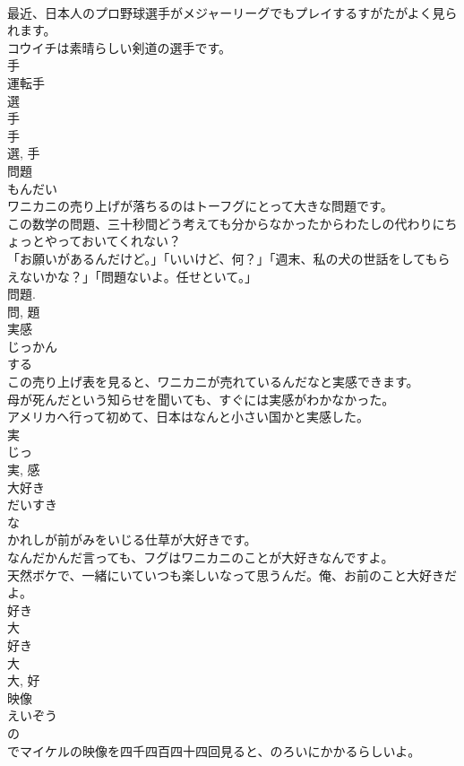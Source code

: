 \documentclass[8pt]{extreport}
\begin{document}
\begin{CJK}{UTF8}{min}
\\	最近、日本人のプロ野球選手がメジャーリーグでもプレイするすがたがよく見られます。	
\\	コウイチは素晴らしい剣道の選手です。	
\\	手 
\\	運転手 
\\	選 
\\	手 
\\	手 
\\	選, 手	
\\	問題	
\\	もんだい	
\\	ワニカニの売り上げが落ちるのはトーフグにとって大きな問題です。	
\\	この数学の問題、三十秒間どう考えても分からなかったからわたしの代わりにちょっとやっておいてくれない？	
\\	「お願いがあるんだけど。」「いいけど、何？」「週末、私の犬の世話をしてもらえないかな？」「問題ないよ。任せといて。」	
\\	問題.	
\\	問, 題	
\\	実感	
\\	じっかん	
\\	する 
\\	この売り上げ表を見ると、ワニカニが売れているんだなと実感できます。	
\\	母が死んだという知らせを聞いても、すぐには実感がわかなかった。	
\\	アメリカへ行って初めて、日本はなんと小さい国かと実感した。	
\\	実 
\\	じっ 
\\	実, 感	
\\	大好き	
\\	だいすき	
\\	な 
\\	かれしが前がみをいじる仕草が大好きです。	
\\	なんだかんだ言っても、フグはワニカニのことが大好きなんですよ。	
\\	天然ボケで、一緒にいていつも楽しいなって思うんだ。俺、お前のこと大好きだよ。	
\\	好き 
\\	大 
\\	好き 
\\	大 
\\	大, 好	
\\	映像	
\\	えいぞう	
\\	の 
\\	でマイケルの映像を四千四百四十四回見ると、のろいにかかるらしいよ。	

\end{CJK}
\end{document}
